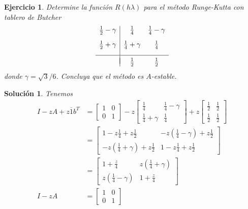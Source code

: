 \documentclass[11pt]{article}
\newtheorem{exercise}{Ejercicio}
\newtheorem*{sol}{Solución}
\newcommand\ol\overline
\begin{document}
\begin{exercise}
  Determine la función $R(h\lambda)$ para el método Runge-Kutta con
  tablero de Butcher
  \begin{equation}
    \begin{array}{c|cc}
      \frac{1}{2}-\gamma & \frac{1}{4} & \frac{1}{4} - \gamma \\[3mm]
      \frac{1}{2}+\gamma & \frac{1}{4} + \gamma & \frac{1}{4} \\[3mm]
      \hline \\[-3mm]
                         & \frac{1}{2} & \frac{1}{2}
    \end{array}
  \end{equation}
  donde $\gamma=\sqrt{3}/6$. Concluya que el método es $A$-estable.
\end{exercise}
\begin{sol}
  Tenemos
  \begin{align}
    I-zA+z\ol 1b^T
    &=
    \begin{bmatrix}
      1 & 0 \\
      0 & 1
    \end{bmatrix}
    -z
    \begin{bmatrix}
      \frac{1}{4} & \frac{1}{4} - \gamma \\[3mm]
      \frac{1}{4} + \gamma & \frac{1}{4}
    \end{bmatrix}
    +z
    \begin{bmatrix}
      \frac{1}{2} & \frac{1}{2} \\[3mm]
      \frac{1}{2} & \frac{1}{2}
    \end{bmatrix}
    \\
    &=
    \begin{bmatrix}
      1-z\frac{1}{4} + z \frac{1}{2}
        & -z(\frac{1}{4} - \gamma) + z \frac{1}{2}
        \\[3mm]
      -z(\frac{1}{4} + \gamma) + z \frac{1}{2}
        & 1-z\frac{1}{4} + z \frac{1}{2}
    \end{bmatrix}
    \\
    &=
    \begin{bmatrix}
      1+\frac{z}{4}
        & z(\frac{1}{4} + \gamma)
        \\[3mm]
      z(\frac{1}{4} - \gamma)
        & 1+\frac{z}{4}
    \end{bmatrix}
    \\
    I-zA
    &=
    \begin{bmatrix}
      1 & 0 \\
      0 & 1
    \end{bmatrix}

\end{align}
\end{sol}
\end{document}
